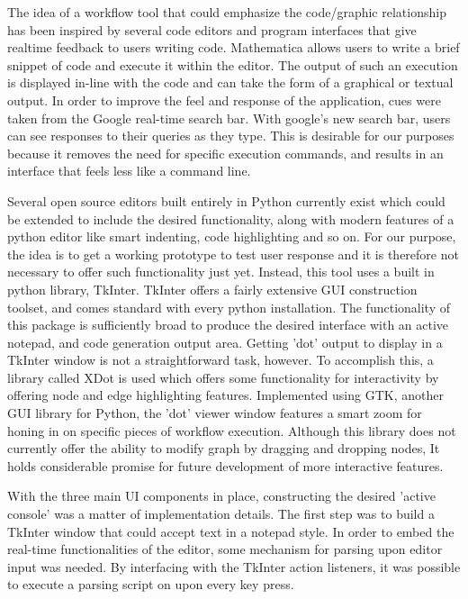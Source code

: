 	The idea of a workflow tool that could emphasize the code/graphic relationship has been inspired by several code editors and program interfaces that give realtime feedback to users writing code. Mathematica allows users to write a brief snippet of code and execute it within the editor. The output of such an execution is displayed in-line with the code and can take the form of a graphical or textual output. In order to improve the feel and response of the application, cues were taken from the Google real-time search bar. With google's new search bar, users can see responses to their queries as they type. This is desirable for our purposes because it removes the need for specific execution commands, and results in an interface that feels less like a command line. 
	
	Several open source editors built entirely in Python currently exist which could be extended to include the desired functionality, along with modern features of a python editor like smart indenting, code highlighting and so on. For our purpose, the idea is to get a working prototype to test user response and it is therefore not necessary to offer such functionality just yet. Instead, this tool uses a built in python library, TkInter. TkInter offers a fairly extensive GUI construction toolset, and comes standard with every python installation. The functionality of this package is sufficiently broad to produce the desired interface with an active notepad, and code generation output area. Getting 'dot' output to display in a TkInter window is not a straightforward task, however. To accomplish this, a library called XDot is used which offers some functionality for interactivity by offering node and edge highlighting features. Implemented using GTK, another GUI library for Python, the 'dot' viewer window features a smart zoom for honing in on specific pieces of workflow execution. Although this library does not currently offer the ability to modify graph by dragging and dropping nodes, It holds considerable promise for future development of more interactive features. 
	
	With the three main UI components in place, constructing the desired 'active console' was a matter of implementation details. The first step was to build a TkInter window that could accept text in a notepad style. In order to embed the real-time  functionalities of the editor, some mechanism for parsing upon editor input was needed. By interfacing with the TkInter action listeners, it was possible to execute a parsing script on upon every key press. 
	
